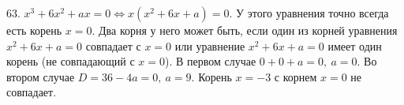 63. $x^3+6x^2+ax=0\Leftrightarrow x(x^2+6x+a)=0.$ У этого уравнения точно всегда есть корень $x=0.$ Два корня у него может быть, если один из корней уравнения
$x^2+6x+a=0$ совпадает с $x=0$ или уравнение $x^2+6x+a=0$ имеет один корень (не совпадающий с $x=0$). В первом случае $0+0+a=0,\ a=0.$ Во втором случае $D=36-4a=0,\ a=9.$ Корень $x=-3$ с корнем $x=0$ не совпадает.\\
